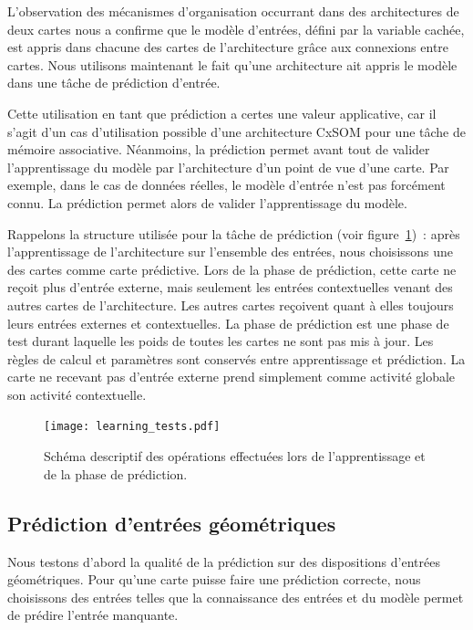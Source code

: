 \documentclass[../main]{subfiles}
\begin{document}
L'observation des mécanismes d'organisation occurrant dans des architectures de deux cartes nous a confirme que le modèle d'entrées, défini par la variable cachée, est appris dans chacune des cartes de l'architecture grâce aux connexions entre cartes.
Nous utilisons maintenant le fait qu'une architecture ait appris le modèle dans une tâche de prédiction d'entrée.

Cette utilisation en tant que prédiction a certes une valeur applicative, car il s'agit d'un cas d'utilisation possible d'une architecture CxSOM pour une tâche de mémoire associative. Néanmoins, la prédiction permet avant tout de valider l'apprentissage du modèle par l'architecture d'un point de vue d'une carte. Par exemple, dans le cas de données réelles, le modèle d'entrée n'est pas forcément connu. La prédiction permet alors de valider l'apprentissage du modèle.

Rappelons la structure utilisée pour la tâche de prédiction (voir figure~\ref{fig:schema_pred})~: après l'apprentissage de l'architecture sur l'ensemble des entrées, nous choisissons une des cartes comme carte prédictive. 
Lors de la phase de prédiction, cette carte ne reçoit plus d'entrée externe, mais seulement les entrées contextuelles venant des autres cartes de l'architecture. 
Les autres cartes reçoivent quant à elles toujours leurs entrées externes et contextuelles. La phase de prédiction est une phase de test durant laquelle les poids de toutes les cartes ne sont pas mis à jour. Les règles de calcul et paramètres sont conservés entre apprentissage et prédiction. La carte ne recevant pas d'entrée externe prend simplement comme activité globale son activité contextuelle. 

\begin{figure}
	\texttt{[image: learning\_tests.pdf]}
	\caption{Schéma descriptif des opérations effectuées lors de l'apprentissage et de la phase de prédiction.\label{fig:schema_pred}}
\end{figure}


\subsection{Prédiction d'entrées géométriques}

Nous testons d'abord la qualité de la prédiction sur des dispositions d'entrées géométriques.
Pour qu'une carte puisse faire une prédiction correcte, nous choisissons des entrées telles que la connaissance des entrées et du modèle permet de prédire l'entrée manquante.
\end{document}
